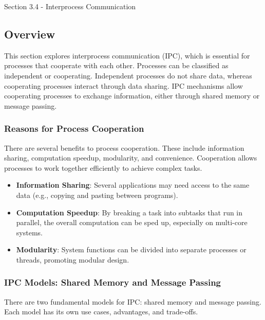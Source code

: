 \begin{notes}{Section 3.4 - Interprocess Communication}
    \subsection*{Overview}

    This section explores interprocess communication (IPC), which is essential for processes that cooperate with each other. Processes can be classified as independent or cooperating. Independent processes 
    do not share data, whereas cooperating processes interact through data sharing. IPC mechanisms allow cooperating processes to exchange information, either through shared memory or message passing.
    
    \subsubsection*{Reasons for Process Cooperation}
    
    There are several benefits to process cooperation. These include information sharing, computation speedup, modularity, and convenience. Cooperation allows processes to work together efficiently to 
    achieve complex tasks.
    
    \begin{highlight}
    
        \begin{itemize}
            \item \textbf{Information Sharing}: Several applications may need access to the same data (e.g., copying and pasting between programs).
            \item \textbf{Computation Speedup}: By breaking a task into subtasks that run in parallel, the overall computation can be sped up, especially on multi-core systems.
            \item \textbf{Modularity}: System functions can be divided into separate processes or threads, promoting modular design.
        \end{itemize}
    
    \end{highlight}
    
    \subsubsection*{IPC Models: Shared Memory and Message Passing}
    
    There are two fundamental models for IPC: shared memory and message passing. Each model has its own use cases, advantages, and trade-offs. 
    

\end{notes}
